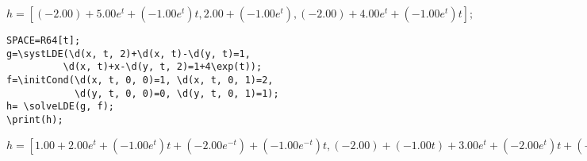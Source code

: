 {$h = [(-2. 00)+5. 00 e^{t}+(-1. 00 e^{t}) t, 2. 00+(-1. 00 e^{t}), (-2. 00)+4. 00 e^{t}+(-1. 00 e^{t}) t];$}

\begin{verbatim}
SPACE=R64[t];
g=\systLDE(\d(x, t, 2)+\d(x, t)-\d(y, t)=1, 
          \d(x, t)+x-\d(y, t, 2)=1+4\exp(t));
f=\initCond(\d(x, t, 0, 0)=1, \d(x, t, 0, 1)=2, 
            \d(y, t, 0, 0)=0, \d(y, t, 0, 1)=1);
h= \solveLDE(g, f);  
\print(h);
\end{verbatim}

{$h = [1. 00+2. 00 e^{t}+(-1. 00 e^{t}) t+(-2. 00 e^{-t})+(-1. 00 e^{-t}) t, (-2. 00)+(-1. 00 t)+3. 00 e^{t}+(-2. 00 e^{t}) t+(-1. 00 e^{-t})];$}

